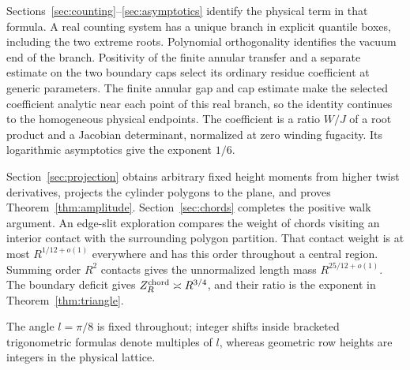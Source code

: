 Sections~\ref{sec:counting}--\ref{sec:asymptotics} identify the physical term in that formula. A real counting system has a unique branch in explicit quantile boxes, including the two extreme roots. Polynomial orthogonality identifies the vacuum end of the branch. Positivity of the finite annular transfer and a separate estimate on the two boundary caps select its ordinary residue coefficient at generic parameters. The finite annular gap and cap estimate make the selected coefficient analytic near each point of this real branch, so the identity continues to the homogeneous physical endpoints. The coefficient is a ratio $W/J$ of a root product and a Jacobian determinant, normalized at zero winding fugacity. Its logarithmic asymptotics give the exponent $1/6$.

Section~\ref{sec:projection} obtains arbitrary fixed height moments from higher twist derivatives, projects the cylinder polygons to the plane, and proves Theorem~\ref{thm:amplitude}. Section~\ref{sec:chords} completes the positive walk argument. An edge-slit exploration compares the weight of chords visiting an interior contact with the surrounding polygon partition. That contact weight is at most $R^{1/12+o(1)}$ everywhere and has this order throughout a central region. Summing order $R^2$ contacts gives the unnormalized length mass $R^{25/12+o(1)}$. The boundary deficit gives $Z_R^{\rm chord}\asymp R^{3/4}$, and their ratio is the exponent in Theorem~\ref{thm:triangle}.

The angle $l=\pi/8$ is fixed throughout; integer shifts inside bracketed trigonometric formulas denote multiples of $l$, whereas geometric row heights are integers in the physical lattice.
